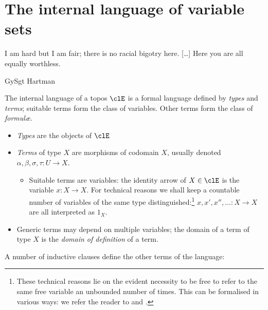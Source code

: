 \section{The internal language of variable sets}
\epigraph{I am hard but I am fair; there is no racial bigotry here. [\dots\unkern] Here you are all equally worthless.}{GySgt Hartman}
The internal language of a topos $\clE$ is a formal language defined by \emph{types} and \emph{terms}; suitable terms form the class of variables. Other terms form the class of \emph{formul\ae}.
\begin{itemize}
  \item \emph{Types} are the objects of $\clE$
  \item \emph{Terms} of type $X$ are morphisms of codomain $X$, usually denoted $\alpha,\beta,\sigma,\tau : U \to X$.
        \begin{itemize}
          \item Suitable terms are variables: the identity arrow of $X\in\clE$ is the variable  $x : X \to X$. For technical reasons we shall keep a countable number of variables of the same type distinguished:\footnote{These technical reasons lie on the evident necessity to be free to refer to the same free variable an unbounded number of times. This can be formalised in various ways: we refer the reader to \cite[]{lambekscott} and \cite[]{johnstopos}.} $x,x',x'',\dots : X \to X$ are all interpreted as $1_X$.
        \end{itemize}
  \item Generic terms may depend on multiple variables; the domain of a term of type $X$ is the \emph{domain of definition} of a term.
\end{itemize}
A number of inductive clauses define the other terms of the language:

